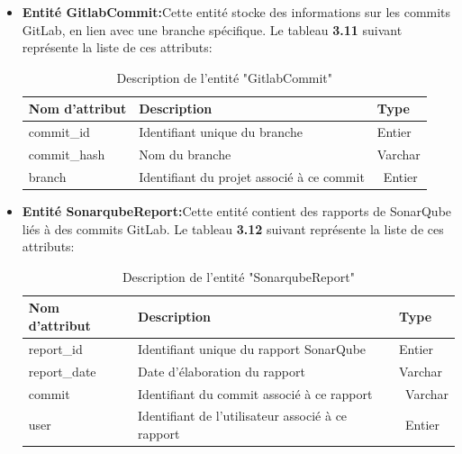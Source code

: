 \begin{itemize}
\begin{center}
\begin{longtable}{|p{3cm}|p{11cm}|p{2cm}|}
                \end{longtable}
        \end{center}
        \vspace{-1cm}
        \item \textbf{Entité GitlabCommit:}Cette entité stocke des informations sur les commits GitLab, en lien avec une branche spécifique.
        Le tableau \textbf{3.11} suivant représente la liste de ces attributs:
        \begin{center}   
                \begin{longtable}{|p{3cm}|p{11cm}|p{2cm}|}
                    \caption {Description de l'entité "GitlabCommit"} \\
                    \hline
                    \rowcolor{blue!18}\textbf{\large{Nom d'attribut}} & \textbf{\large{Description}} & \textbf{\large{Type}} \\
                    \hline
                    commit\_id& Identifiant unique du branche&  Entier\\\hline
                    commit\_hash& Nom du branche& Varchar\\\hline
                    branch& Identifiant du projet associé à ce commit&\ Entier\\\hline
              

                \end{longtable}
        \end{center}
        \vspace{-1cm}
        \item \textbf{Entité SonarqubeReport:}Cette entité contient des rapports de SonarQube liés à des commits GitLab.
        Le tableau \textbf{3.12} suivant représente la liste de ces attributs:
        \begin{center}   
                \begin{longtable}{|p{3cm}|p{11cm}|p{2cm}|}
                    \caption {Description de l'entité "SonarqubeReport"} \\
                    \hline
                    \rowcolor{blue!18}\textbf{\large{Nom d'attribut}} & \textbf{\large{Description}} & \textbf{\large{Type}} \\
                    \hline
                    report\_id& Identifiant unique du rapport SonarQube &  Entier\\\hline
                    report\_date& Date d'élaboration du rapport& Varchar\\\hline
                    commit& Identifiant du commit associé à ce rapport &\ Varchar\\\hline
                    user& Identifiant de l'utilisateur associé à ce rapport&\ Entier\\\hline
                    

                \end{longtable}
        \end{center}

    \end{itemize}
    
